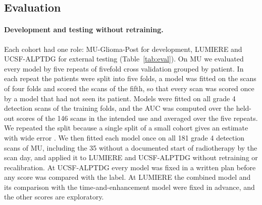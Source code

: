 \subsection{Evaluation}\label{sec:2.3}

\paragraph*{Development and testing without retraining.} Each cohort had one role: MU-Glioma-Post for development,
LUMIERE and UCSF-ALPTDG for external testing (Table~\ref{tab:eval}). On MU we evaluated every model by five repeats of
fivefold cross validation grouped by patient. In each repeat the patients were split into five folds, a model was
fitted on the scans of four folds and scored the scans of the fifth, so that every scan was scored once by a model that
had not seen its patient. Models were fitted on all grade 4 detection scans of the training folds, and the AUC was
computed over the held-out scores of the 146 scans in the intended use and averaged over the five repeats. We repeated
the split because a single split of a small cohort gives an estimate with wide error \citep{varoquaux2018}. We then
fitted each model once on all 181 grade 4 detection scans of MU, including the 35 without a documented start of
radiotherapy by the scan day, and applied it to LUMIERE and UCSF-ALPTDG without retraining or recalibration. At
UCSF-ALPTDG every model was fixed in a written plan before any score was compared with the label. At LUMIERE the
combined model and its comparison with the time-and-enhancement model were fixed in advance, and the other scores are
exploratory.

